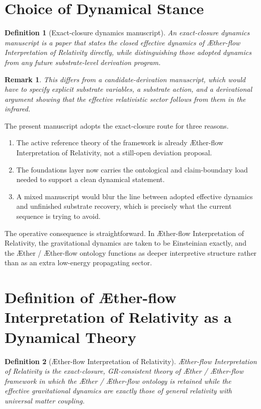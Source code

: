 \documentclass[11pt]{article}
\newcommand{\Aether}{\AE{}ther}
\newcommand{\Aflow}{\AE{}ther-flow}
\newcommand{\TheoryName}{\Aflow{} Interpretation of Relativity}
\newcommand{\TheoryProgram}{\Aether{} / \Aflow{} framework}
\newtheorem{definition}{Definition}
\newtheorem{remark}{Remark}
\begin{document}
\section{Choice of Dynamical Stance}

\begin{definition}[Exact-closure dynamics manuscript]
An exact-closure dynamics manuscript is a paper that states the closed effective dynamics of \TheoryName{} directly, while distinguishing those adopted dynamics from any future substrate-level derivation program.
\end{definition}

\begin{remark}
This differs from a candidate-derivation manuscript, which would have to specify explicit substrate variables, a substrate action, and a derivational argument showing that the effective relativistic sector follows from them in the infrared.
\end{remark}

The present manuscript adopts the exact-closure route for three reasons.
\begin{enumerate}
    \item The active reference theory of the framework is already \TheoryName{}, not a still-open deviation proposal.
    \item The foundations layer now carries the ontological and claim-boundary load needed to support a clean dynamical statement.
    \item A mixed manuscript would blur the line between adopted effective dynamics and unfinished substrate recovery, which is precisely what the current sequence is trying to avoid.
\end{enumerate}

The operative consequence is straightforward. In \TheoryName{}, the gravitational dynamics are taken to be Einsteinian exactly, and the \Aether{} / \Aflow{} ontology functions as deeper interpretive structure rather than as an extra low-energy propagating sector.

\section{Definition of \TheoryName{} as a Dynamical Theory}

\begin{definition}[\TheoryName{}]
\TheoryName{} is the exact-closure, GR-consistent theory of \TheoryProgram{} in which the \Aether{} / \Aflow{} ontology is retained while the effective gravitational dynamics are exactly those of general relativity with universal matter coupling.
\end{definition}
\end{document}
